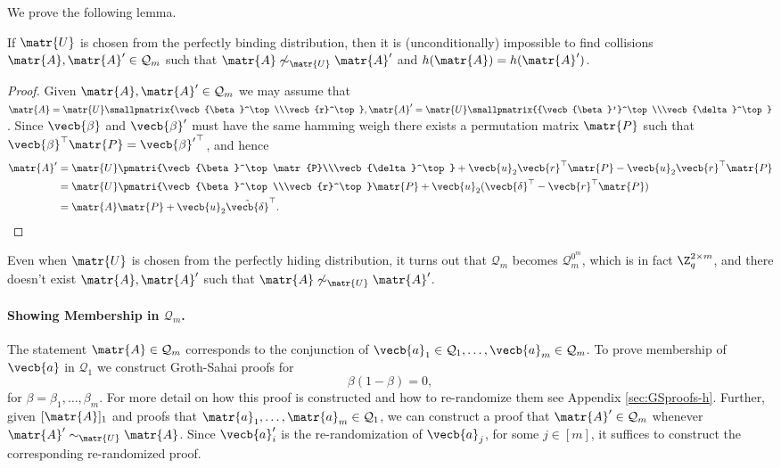 We prove the following lemma.
\begin{lemma}
If $\matr{U}$ is chosen from the perfectly binding distribution, then it is (unconditionally) impossible to find collisions $\matr{A},\matr{A}'\in\mathcal{Q}_m$ such that $\matr{A}\not\sim_\matr{U}\matr{A}'$ and $h(\matr{A})=h(\matr{A}')$.
\end{lemma}
\begin{proof}
Given $\matr{A},\matr{A}'\in\mathcal{Q}_m$ we may assume that $\matr{A}=\matr{U}\smallpmatrix{\vecb{\beta}^\top\\\vecb{r}^\top},\matr{A}'=\matr{U}\smallpmatrix{{\vecb{\beta}'}^\top\\\vecb{\delta}^\top}$. Since $\vecb{\beta}$ and $\vecb{\beta}'$ must have the same hamming weigh there exists a permutation matrix $\matr{P}$ such that $\vecb{\beta}^\top\matr{P} = {\vecb{\beta}'}^\top$, and hence
\begin{align*}
\matr{A}' &= \matr{U}\pmatri{\vecb{\beta}^\top\matr{P}\\\vecb{\delta}^\top}+ \vecb{u}_2\vecb{r}^\top\matr{P} - \vecb{u}_2\vecb{r}^\top\matr{P}\\
&=
\matr{U} \pmatri{\vecb{\beta}^\top\\\vecb{r}^\top}\matr{P} + \vecb{u}_2(\vecb{\delta}^\top-\vecb{r}^\top\matr{P})\\
 &=
 \matr{A}\matr{P} + \vecb{u}_2\tilde{\vecb{\delta}}^\top.
\end{align*}
\end{proof}

Even 
when $\matr{U}$ is chosen from the perfectly hiding distribution, it turns out that $\mathcal{Q}_m$ becomes $\mathcal{Q}_m^{0^m}$, which is in fact $\Z_q^{2\times m}$, and there doesn't exist $\matr{A},\matr{A}'$ such that $\matr{A}\not\sim_{\matr{U}}\matr{A}'$. 

\paragraph{Showing Membership in $\mathcal{Q}_m$.}
The statement $\matr{A}\in\mathcal{Q}_m$ corresponds to the conjunction of $\vecb{a}_1\in\mathcal{Q}_1,\ldots,\vecb{a}_m\in\mathcal{Q}_m$.
To prove membership of $\vecb{a}$ in $\mathcal{Q}_1$ we construct Groth-Sahai proofs for
\begin{equation}
\beta(1-\beta)=0 \label{eq:Qm-memb},
\end{equation}
for $\beta=\beta_1,\ldots,\beta_m$. For more detail on how this proof is constructed and how to re-randomize them see Appendix \ref{sec:GSproofs-h}.
Further, given $[\matr{A}]_1$ and proofs that $\matr{a}_1,\ldots,\matr{a}_m\in\mathcal{Q}_1$, we can construct a proof that $\matr{A}'\in\mathcal{Q}_m$ whenever $\matr{A}'\sim_\matr{U}\matr{A}$. Since $\vecb{a}'_i$ is the re-randomization of $\vecb{a}_j$, for some $j\in[m]$, it suffices to construct the corresponding re-randomized proof.

